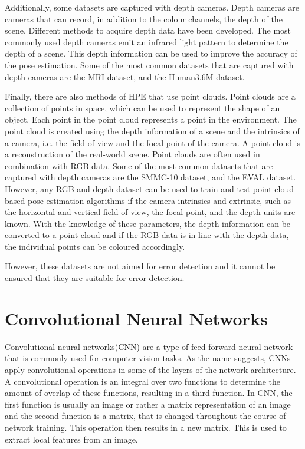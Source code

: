 Additionally, some datasets are captured with depth cameras. Depth cameras are cameras that can record, in addition to the colour channels, the depth of the scene. Different methods to acquire depth data have been developed. The most commonly used depth cameras emit an infrared light pattern to determine the depth of a scene. This depth information can be used to improve the accuracy of the pose estimation. Some of the most common datasets that are captured with depth cameras are the MRI dataset\cite{mRI}, and the Human3.6M dataset\cite{h36m_pami}.

Finally, there are also methods of HPE that use point clouds. Point clouds are a collection of points in space, which can be used to represent the shape of an object. Each point in the point cloud represents a point in the environment. The point cloud is created using the depth information of a scene and the intrinsics of a camera, i.e. the field of view and the focal point of the camera. A point cloud is a reconstruction of the real-world scene. Point clouds are often used in combination with RGB data. Some of the most common datasets that are captured with depth cameras are the SMMC-10 dataset\cite{SMMC10}, and the EVAL dataset\cite{EVAL}. However, any RGB and depth dataset can be used to train and test point cloud-based pose estimation algorithms if the camera intrinsics and extrinsic, such as the horizontal and vertical field of view, the focal point, and the depth units are known. With the knowledge of these parameters, the depth information can be converted to a point cloud and if the RGB data is in line with the depth data, the individual points can be coloured accordingly.

However, these datasets are not aimed for error detection and it cannot be ensured that they are suitable for error detection.

\section{Convolutional Neural Networks}

Convolutional neural networks(CNN) are a type of feed-forward neural network that is commonly used for computer vision tasks. As the name suggests, CNNs apply convolutional operations in some of the layers of the network architecture. A convolutional operation is an integral over two functions to determine the amount of overlap of these functions, resulting in a third function. In CNN, the first function is usually an image or rather a matrix representation of an image and the second function is a matrix, that is changed throughout the course of network training. This operation then results in a new matrix. This is used to extract local features from an image.

